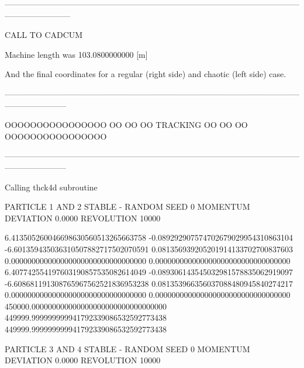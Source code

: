 \begin{ctverbatim}
------------------------------------------------------------------------------------------------------------------------------------

  CALL TO CADCUM

 Machine length was    103.0800000000 [m]
\end{ctverbatim}

\clearpage

And the final coordinates for a regular (right side) and chaotic (left side) case.

\begin{ctverbatim}
-----------------------------------------------------------------------------------------------------------------------------------

         OOOOOOOOOOOOOOOO
         OO            OO
         OO  TRACKING  OO
         OO            OO
         OOOOOOOOOOOOOOOO

-----------------------------------------------------------------------------------------------------------------------------------



 Calling thck4d subroutine


     PARTICLE       1 AND       2 STABLE - RANDOM SEED        0 MOMENTUM DEVIATION   0.0000
     REVOLUTION    10000

                      6.413505260046698630560513265663758
                     -0.089292907574702679029954310863104
                     -6.601359435036310507882717502070591
                      0.081356939205201914133702700837603
                      0.000000000000000000000000000000000
                      0.000000000000000000000000000000000
                      6.407742554197603190857535082614049
                     -0.089306143545032981578835062919097
                     -6.608681191308765967562521836953238
                      0.081353966356037088480945840274217
                      0.000000000000000000000000000000000
                      0.000000000000000000000000000000000
                 450000.000000000000000000000000000000000
                 449999.999999999941792339086532592773438
                 449999.999999999941792339086532592773438

     PARTICLE       3 AND       4 STABLE - RANDOM SEED        0 MOMENTUM DEVIATION   0.0000
     REVOLUTION    10000


\end{ctverbatim}
